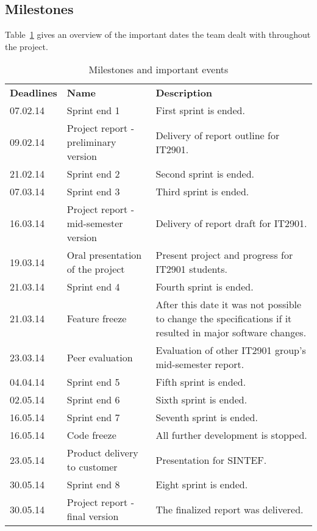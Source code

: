 \subsection{Milestones}
Table~\ref{tab:milestones} gives an overview of the important dates the team dealt with throughout the project. 

\begin{table}[H]
\centering
{}
\begin{tabular}{|l|p{6.7cm}|p{6.5cm}|}
\hline
\textbf{Deadlines} & \textbf{Name} & \textbf{Description}\\
07.02.14 & Sprint end 1 & First sprint is ended. \\
09.02.14& Project report - preliminary version & Delivery of report outline for IT2901.\\
21.02.14& Sprint end 2 & Second sprint is ended. \\
07.03.14& Sprint end 3 & Third sprint is ended.\\
16.03.14& Project report - mid-semester version &  Delivery of report draft for IT2901. \\
19.03.14 & Oral presentation of the project & Present project and progress for IT2901 students.\\
21.03.14& Sprint end 4 & Fourth sprint is ended.\\
21.03.14 & Feature freeze & After this date it was not possible to change the specifications if it resulted in major software changes.\\
23.03.14 & Peer evaluation &  Evaluation of other IT2901 group's mid-semester report. \\
04.04.14& Sprint end 5 & Fifth sprint is ended.\\
02.05.14& Sprint end 6 & Sixth sprint is ended.\\
16.05.14& Sprint end 7 & Seventh sprint is ended.\\
16.05.14& Code freeze & All further development is stopped.\\
23.05.14& Product delivery to customer & Presentation for SINTEF.\\ 
30.05.14& Sprint end 8 & Eight sprint is ended.\\
30.05.14 & Project report - final version & The finalized report was delivered.\\\hline
\end{tabular}
\caption{Milestones and important events}
\label{tab:milestones}
\end{table}
\newpage

